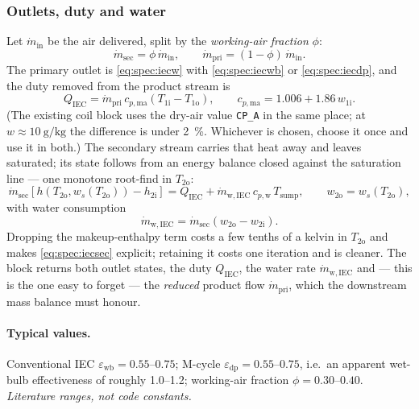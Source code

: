 \documentclass[11pt]{article}
\newcommand{\md}{\ensuremath{\dot m}}
\begin{document}
\subsubsection{Outlets, duty and water}
Let $\md_{\mathrm{in}}$ be the air delivered, split by the \emph{working-air fraction} $\phi$:
\begin{equation}
\md_{\mathrm{sec}} = \phi\,\md_{\mathrm{in}} ,
\qquad
\md_{\mathrm{pri}} = (1-\phi)\,\md_{\mathrm{in}} .
\label{eq:spec:iecphi}
\end{equation}
The primary outlet is \eqref{eq:spec:iecw} with \eqref{eq:spec:iecwb} or \eqref{eq:spec:iecdp}, and
the duty removed from the product stream is
\begin{equation}
Q_{\mathrm{IEC}} = \md_{\mathrm{pri}}\,c_{p,\mathrm{ma}}\left(T_{\mathrm{1i}}-T_{\mathrm{1o}}\right),
\qquad c_{p,\mathrm{ma}} = 1.006 + 1.86\,w_{\mathrm{1i}} .
\label{eq:spec:iecQ}
\end{equation}
(The existing coil block uses the dry-air value \texttt{CP\_A} in the same place; at
$w\approx\SI{10}{\gram\per\kilogram}$ the difference is under \SI{2}{\percent}. Whichever is chosen,
choose it once and use it in both.) The secondary stream carries that heat away and leaves saturated;
its state follows from an energy balance closed against the saturation line --- one monotone
root-find in $T_{\mathrm{2o}}$:
\begin{equation}
\md_{\mathrm{sec}}\left[h\!\left(T_{\mathrm{2o}},w_{s}(T_{\mathrm{2o}})\right)-h_{\mathrm{2i}}\right]
= Q_{\mathrm{IEC}} + \md_{\mathrm{w,IEC}}\,c_{p,\mathrm{w}}\,T_{\mathrm{sump}} ,
\qquad
w_{\mathrm{2o}} = w_{s}(T_{\mathrm{2o}}) ,
\label{eq:spec:iecsec}
\end{equation}
with water consumption
\begin{equation}
\md_{\mathrm{w,IEC}} = \md_{\mathrm{sec}}\left(w_{\mathrm{2o}}-w_{\mathrm{2i}}\right) .
\label{eq:spec:iecwater}
\end{equation}
Dropping the makeup-enthalpy term costs a few tenths of a kelvin in $T_{\mathrm{2o}}$ and makes
\eqref{eq:spec:iecsec} explicit; retaining it costs one iteration and is cleaner. The block returns
both outlet states, the duty $Q_{\mathrm{IEC}}$, the water rate $\md_{\mathrm{w,IEC}}$ and --- this
is the one easy to forget --- the \emph{reduced} product flow $\md_{\mathrm{pri}}$, which the
downstream mass balance must honour.

\paragraph{Typical values.} Conventional IEC $\varepsilon_{\mathrm{wb}}=\numrange{0.55}{0.75}$;
M-cycle $\varepsilon_{\mathrm{dp}}=\numrange{0.55}{0.75}$, i.e.\ an apparent wet-bulb effectiveness of
roughly \numrange{1.0}{1.2}; working-air fraction $\phi=\numrange{0.30}{0.40}$. \emph{Literature
ranges, not code constants.}
\end{document}
